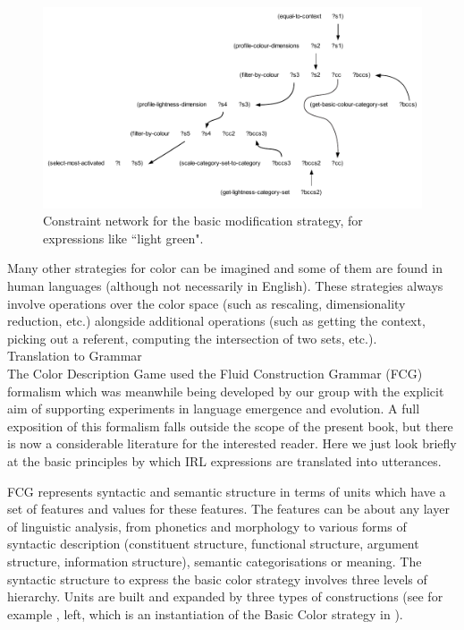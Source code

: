 \begin{figure}[htbp]
  \centerline{\includegraphics[width=1.0\textwidth]{chap11/figs/modi}}
\caption{\label{fig:modi} 
Constraint network for the basic modification strategy, for expressions like ``light green".}
\end{figure}

Many other strategies for color can be imagined and some of them are found in human languages (although not necessarily in English). 
These strategies always involve operations over the color space (such as rescaling, dimensionality reduction, etc.) alongside 
additional operations (such as getting the context, picking out a referent, computing the intersection of two sets, etc.). \\

{\bfshape Translation to Grammar} \\

The Color Description Game used the Fluid Construction Grammar (FCG) formalism which was meanwhile being developed by our 
group with the explicit aim of supporting experiments in language emergence and evolution. A full exposition of this 
formalism falls outside the scope of the present book, but there is now a considerable literature for the interested 
reader.\cite{Steels:2011} Here we just look briefly at the basic principles by which IRL 
expressions are translated into utterances. 

FCG represents syntactic and semantic structure in terms of units which have a set of features and values for these 
features. The features can be about any layer of linguistic analysis, from phonetics and morphology to various 
forms of syntactic description (constituent structure, functional structure, argument structure, information structure), 
semantic categorisations or meaning. 
The syntactic structure to express the basic color strategy involves three levels of hierarchy. Units are built 
and expanded by three types of constructions (see for example , left, which is an instantiation of 
the Basic Color strategy in ). 

